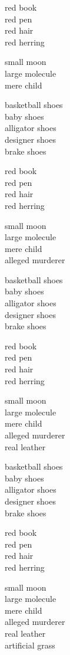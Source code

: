\documentclass{article}
\begin{document}
\begin{huge}
red book\\
red pen\\
red hair\\
red herring

small moon\\
large molecule\\
mere child


basketball shoes\\
baby shoes\\
alligator shoes\\
designer shoes\\
brake shoes

red book\\
red pen\\
red hair\\
red herring

small moon\\
large molecule\\
mere child\\
alleged murderer


basketball shoes\\
baby shoes\\
alligator shoes\\
designer shoes\\
brake shoes

red book\\
red pen\\
red hair\\
red herring

small moon\\
large molecule\\
mere child\\
alleged murderer\\
real leather


basketball shoes\\
baby shoes\\
alligator shoes\\
designer shoes\\
brake shoes

red book\\
red pen\\
red hair\\
red herring

small moon\\
large molecule\\
mere child\\
alleged murderer\\
real leather\\
artificial grass



\end{huge}
\end{document}
